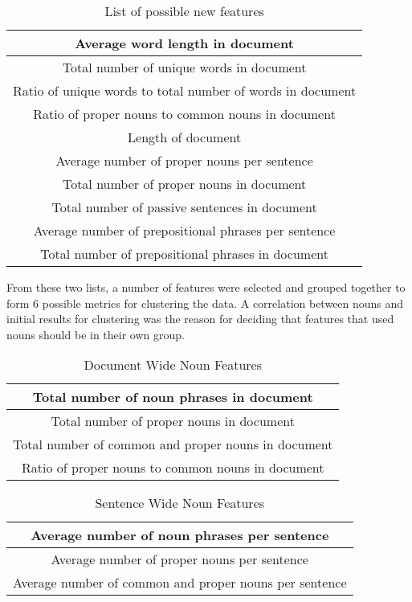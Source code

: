 \documentclass[]{article}
\begin{document}
\begin{table}[!htbp]
	\begin{center}
		\begin{tabular}{| c |} \hline
			Average word length in document \\ \hline
			Total number of unique words in document\\ \hline
			Ratio of unique words to total number of words in document \\ \hline
			Ratio of proper nouns to common nouns in document \\ \hline
			Length of document \\ \hline
			Average number of proper nouns per sentence \\ \hline
			Total number of proper nouns in document \\ \hline
			Total number of passive sentences in document \\ \hline
			Average number of prepositional phrases per sentence \\ \hline
			Total number of prepositional phrases in document \\ \hline
		\end{tabular}
	\end{center}
	\caption{List of possible new features}
	\label{table:features2}
\end{table}

From these two lists, a number of features were selected and grouped together to form 6 possible metrics for clustering the data.
A correlation between nouns and initial results for clustering was the reason for deciding that features that used nouns should be in their own group.

\begin{table}[!htbp]
	\begin{center}
		\begin{tabular}{| c |} \hline
			Total number of noun phrases in document \\ \hline
      Total number of proper nouns in document \\ \hline
			Total number of common and proper nouns in document \\ \hline
			Ratio of proper nouns to common nouns in document \\ \hline
		\end{tabular}
	\end{center}
	\caption{Document Wide Noun Features}
	\label{table:group1}
\end{table}

\begin{table}[!htbp]
	\begin{center}
		\begin{tabular}{| c |} \hline
      Average number of noun phrases per sentence \\ \hline
			Average number of proper nouns per sentence \\ \hline
			Average number of common and proper nouns per sentence \\ \hline
		\end{tabular}
	\end{center}
	\caption{Sentence Wide Noun Features}
	\label{table:group2}
\end{table}
\end{document}
